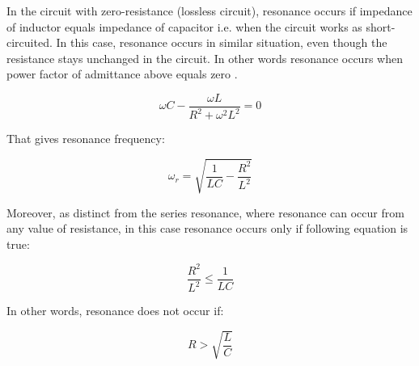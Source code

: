 \documentclass[12pt]{report} %
\begin{document}
In the circuit with zero-resistance (lossless circuit), resonance occurs if impedance of inductor equals impedance of capacitor i.e. when the circuit works as short-circuited. In this case, resonance occurs in similar situation, even though the resistance stays unchanged in the circuit. In other words resonance occurs when power factor of admittance above equals zero \cite{das}.

\begin{equation}
	\omega C-\dfrac{\omega L}{R^2+\omega^2L^2}=0
\end{equation}

That gives resonance frequency:

\begin{equation}
	\omega_r=\sqrt{\dfrac{1}{LC}-\dfrac{R^2}{L^2}}
\end{equation}

Moreover, as distinct from the series resonance, where resonance can occur from any value of resistance, in this case resonance occurs only if following equation is true:

\begin{equation}
	\dfrac{R^2}{L^2}\leq \frac{1}{LC}
\end{equation}

In other words, resonance does not occur if:

\begin{equation}
	R>\sqrt{\dfrac{L}{C}}
\end{equation}
\end{document}
